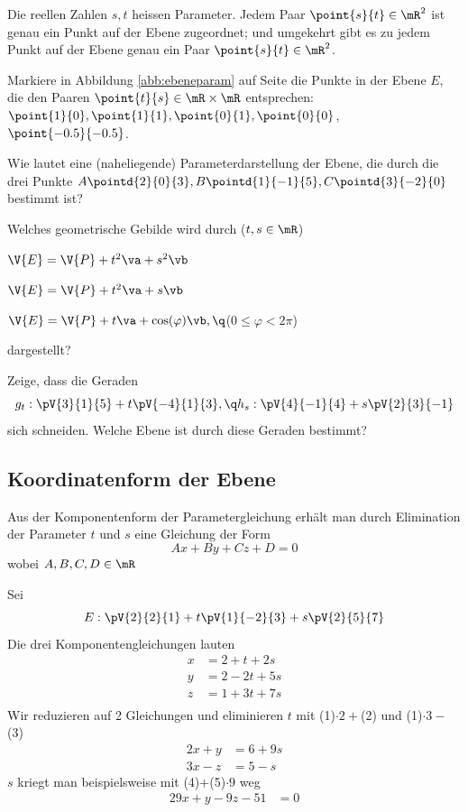 \documentclass[%
11pt,%
twoside,%
titlepage,%
german,%
headsepline%
]{scrartcl}
\begin{document}
\begin{bem}
Die reellen Zahlen $s,t$ heissen Parameter. Jedem Paar $\point{s}{t}\in\mR^2$ ist genau ein Punkt auf der Ebene zugeordnet; und umgekehrt gibt es zu jedem Punkt auf der Ebene genau ein Paar $\point{s}{t}\in\mR^2$.
\end{bem}

\begin{ueb}
Markiere in Abbildung \ref{abb:ebeneparam} auf Seite \pageref{abb:ebeneparam} die Punkte in der Ebene $E$, die den Paaren $\point{t}{s} \in \mR \times \mR$ entsprechen: $\point{1}{0},\point{1}{1}, \point{0}{1},\point{0}{0}$, $\point{-0.5}{-0.5}$.
\end{ueb}

\begin{ueb}[Parameterform]
Wie lautet eine (naheliegende) Parameterdarstellung der Ebene, die durch die drei Punkte $A\pointd{2}{0}{3}, B\pointd{1}{- 1}{5}, C\pointd{3}{- 2}{0}$ bestimmt ist?
\end{ueb}

\begin{ueb}
Welches geometrische Gebilde wird durch ($t,s \in \mR$)
\begin{enumeratea}
\item $\V{E}=\V{P}+t^2\va+s^2\vb$
\item $\V{E}=\V{P}+t^2\va+s\vb$
\item $\V{E}=\V{P}+t\va+\cos(\varphi)\vb,\q$($0\leq\varphi<2\pi$)
\end{enumeratea}
dargestellt?
\end{ueb}

\begin{ueb}[Geraden]
Zeige, dass die Geraden
$$g_t:\pV{3}{1}{5}+t\pV{-4}{1}{3},\q h_s:\pV{4}{-1}{4}+s\pV{2}{3}{-1}$$
sich schneiden. Welche Ebene ist durch diese Geraden bestimmt?
\end{ueb}

\subsection{Koordinatenform der Ebene}
Aus der Komponentenform der Parametergleichung erhält man durch Elimination der Parameter $t$ und $s$ eine Gleichung der Form
$$Ax+By+Cz+D=0$$
wobei $A,B,C,D\in\mR$

\begin{bsp}
Sei
$$E: \pV{2}{2}{1}+t\pV{1}{-2}{3}+s\pV{2}{5}{7}$$
Die drei Komponentengleichungen lauten
\begin{align*}
x&=2+t+2s\tag{1}\\
y&=2-2t+5s\tag{2}\\
z&=1+3t+7s\tag{3}\\
\end{align*}
Wir reduzieren auf 2 Gleichungen und eliminieren $t$ mit (1)$\cdot2+$(2) und (1)$\cdot3-$(3)
\begin{align*}
2x+y&=6+9s\tag{4}\\
3x-z&=5-s\tag{5}
\end{align*}
$s$ kriegt man beispielsweise mit (4)$+$(5)$\cdot9$ weg
\begin{align*}
29x+y-9z-51&=0
\end{align*}
\end{bsp}
\end{document}
